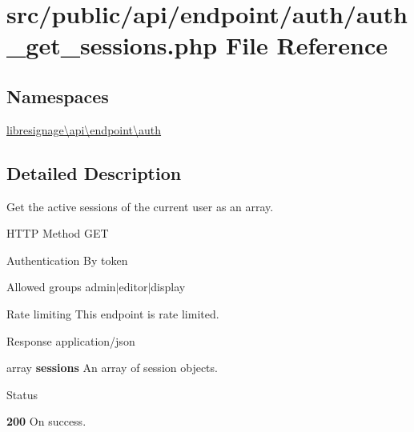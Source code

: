 \hypertarget{src_2public_2api_2endpoint_2auth_2auth__get__sessions_8php}{}\section{src/public/api/endpoint/auth/auth\+\_\+get\+\_\+sessions.php File Reference}
\label{src_2public_2api_2endpoint_2auth_2auth__get__sessions_8php}
\subsection*{Namespaces}
\begin{DoxyCompactItemize}
\item 
 \hyperlink{namespacelibresignage_1_1api_1_1endpoint_1_1auth}{libresignage\textbackslash{}api\textbackslash{}endpoint\textbackslash{}auth}
\end{DoxyCompactItemize}


\subsection{Detailed Description}
Get the active sessions of the current user as an array.

\begin{DoxyParagraph}{H\+T\+TP Method}
G\+ET 
\end{DoxyParagraph}
\begin{DoxyParagraph}{Authentication}
By token 
\end{DoxyParagraph}
\begin{DoxyParagraph}{Allowed groups}
{\ttfamily admin$\vert$editor$\vert$display} 
\end{DoxyParagraph}
\begin{DoxyParagraph}{Rate limiting}
This endpoint is rate limited.
\end{DoxyParagraph}
\begin{DoxyParagraph}{Response}
application/json
\begin{DoxyItemize}
\item {\ttfamily array} {\bfseries sessions} An array of session objects.
\end{DoxyItemize}
\end{DoxyParagraph}
\begin{DoxyParagraph}{Status}

\begin{DoxyItemize}
\item {\bfseries 200} On success. 
\end{DoxyItemize}
\end{DoxyParagraph}

